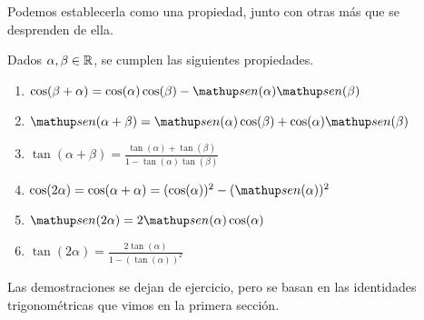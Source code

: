 Podemos establecerla como una propiedad, junto con otras más que se desprenden de ella.

\begin{prop}
Dados $\alpha,\beta\in\mathbb{R}$, se cumplen las siguientes propiedades.
\begin{enumerate}
\item $\cos(\beta+\alpha)=\cos(\alpha)\cos(\beta) - \sen(\alpha)\sen(\beta)$
\item $\sen(\alpha + \beta)= \sen(\alpha)\cos(\beta) + \cos(\alpha)\sen(\beta)$
\item $\tan(\alpha + \beta) =  \frac{\tan(\alpha) + \tan(\beta)}{1-\tan(\alpha)\tan(\beta)}$
\item $\cos(2\alpha) = \cos(\alpha+\alpha) = (\cos(\alpha))^2 - (\sen(\alpha))^2$
\item $\sen(2\alpha) = 2\sen(\alpha)\cos(\alpha)$
\item $\tan(2\alpha) = \frac{2\tan(\alpha)}{1-(\tan(\alpha))^2}$
\end{enumerate}
\end{prop}

Las demostraciones se dejan de ejercicio, pero se basan en las identidades trigonométricas que vimos en la primera sección.


